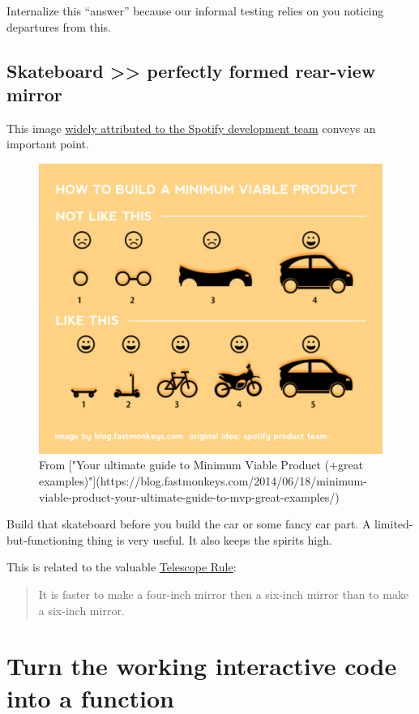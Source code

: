 \documentclass[
]{book}
\begin{document}
Internalize this ``answer'' because our informal testing relies on you noticing departures from this.

\hypertarget{skateboard-perfectly-formed-rear-view-mirror}{%
\subsection{Skateboard \textgreater\textgreater{} perfectly formed rear-view mirror}\label{skateboard-perfectly-formed-rear-view-mirror}}

This image \href{https://blog.fastmonkeys.com/?utm_content=bufferc2d6e\&utm_medium=social\&utm_source=twitter.com\&utm_campaign=buffer}{widely attributed to the Spotify development team} conveys an important point.

\begin{figure}
\includegraphics[width=0.6\linewidth]{img/spotify-howtobuildmvp} \caption{From ["Your ultimate guide to Minimum Viable Product (+great examples)"](https://blog.fastmonkeys.com/2014/06/18/minimum-viable-product-your-ultimate-guide-to-mvp-great-examples/)}\label{fig:spotify-howtobuildmvp}
\end{figure}

Build that skateboard before you build the car or some fancy car part. A limited-but-functioning thing is very useful. It also keeps the spirits high.

This is related to the valuable \href{http://c2.com/cgi/wiki?TelescopeRule}{Telescope Rule}:

\begin{quote}
It is faster to make a four-inch mirror then a six-inch mirror than to make a six-inch mirror.
\end{quote}

\hypertarget{turn-the-working-interactive-code-into-a-function}{%
\section{Turn the working interactive code into a function}\label{turn-the-working-interactive-code-into-a-function}}
\end{document}
